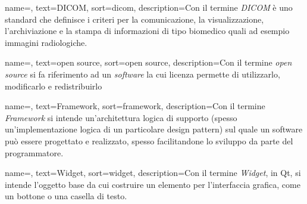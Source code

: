 
{
    name=,
    text=DICOM,
    sort=dicom,
    description={Con il termine \textit{DICOM} è uno standard che definisce i criteri per la comunicazione, la visualizzazione, l'archiviazione e la stampa di informazioni di tipo biomedico quali ad esempio immagini radiologiche.}
}

{
    name=,
    text=open source,
    sort=open source,
    description={Con il termine \textit{open source} si fa riferimento ad un \textit{software} la cui licenza permette di utilizzarlo, modificarlo e redistribuirlo}
}

{
    name=,
    text=Framework,
    sort=framework,
    description={Con il termine \textit{Framework} si intende un'architettura logica di supporto (spesso un'implementazione logica di un particolare design pattern) sul quale un software può essere progettato e realizzato, spesso facilitandone lo sviluppo da parte del programmatore.}
}

{
    name=,
    text=Widget,
    sort=widget,
    description={Con il termine \textit{Widget}, in Qt, si intende l'oggetto base da cui costruire un elemento per l'interfaccia grafica, come un bottone o una casella di testo.}
}

\renewcommand{\acronymname}{Acronimi e abbreviazioni}


